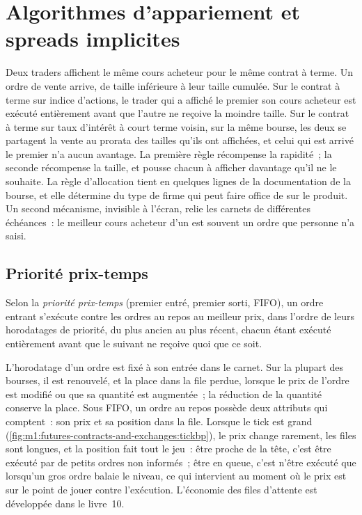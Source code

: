 \chapter{Algorithmes d'appariement et spreads implicites}\label{ch:m1:matching-algorithms-and-implied-spreads}

Deux traders affichent le même cours acheteur pour le même contrat à terme. Un ordre de vente arrive,
de taille inférieure à leur taille cumulée. Sur le contrat à terme sur indice d'actions, le trader
qui a affiché le premier son cours acheteur est exécuté entièrement avant que l'autre ne reçoive la moindre taille. Sur
le contrat à terme sur taux d'intérêt à court terme voisin, sur la même bourse, les deux
se partagent la vente au prorata des tailles qu'ils ont affichées, et celui qui
est arrivé le premier n'a aucun avantage. La première règle récompense la rapidité~; la
seconde récompense la taille, et pousse chacun à afficher davantage qu'il ne le souhaite. La
règle d'allocation tient en quelques lignes de la documentation de la bourse, et elle détermine
du type de firme qui peut faire office de  sur le produit. Un second mécanisme,
invisible à l'écran, relie les carnets de différentes échéances~: le meilleur cours acheteur
d'un  est souvent un ordre que personne n'a saisi.

\section{Priorité prix-temps}

\begin{definition}\label{def:m1:matching-algorithms-and-implied-spreads:fifo}
Selon la \emph{priorité prix-temps} (premier entré, premier
sorti, FIFO), un ordre entrant s'exécute contre les ordres au repos au meilleur
prix, dans l'ordre de leurs horodatages de priorité, du plus ancien au plus récent, chacun étant
exécuté entièrement avant que le suivant ne reçoive quoi que ce soit.
\end{definition}

L'horodatage d'un ordre est fixé à son entrée dans le carnet. Sur la plupart des bourses, il est
renouvelé, et la place dans la file perdue, lorsque le prix de l'ordre est modifié
ou que sa quantité est augmentée~; la réduction de la quantité conserve la place. Sous FIFO,
un ordre au repos possède deux attributs qui comptent~: son prix et sa position
dans la file. Lorsque le tick est grand (\cref{fig:m1:futures-contracts-and-exchanges:tickbp}),
le prix change rarement, les files sont longues, et la position fait tout le jeu~:
être proche de la tête, c'est être exécuté par de petits ordres non informés~;
être en queue, c'est n'être exécuté que lorsqu'un gros ordre balaie le niveau,
ce qui intervient au moment où le prix est sur le point de jouer contre l'exécution. L'économie
des files d'attente est développée dans le livre~10.

